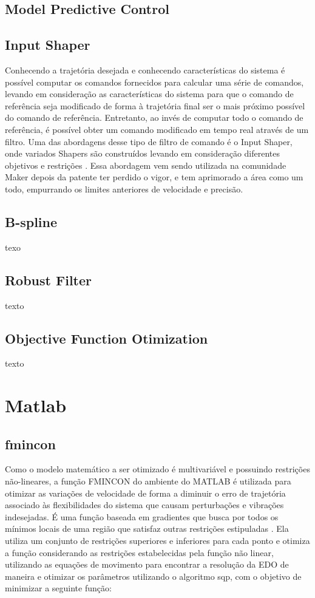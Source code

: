 \subsection{Model Predictive Control}

\subsection{Input Shaper}
Conhecendo a trajetória desejada e conhecendo características 
do sistema é possível computar os comandos fornecidos para 
calcular uma série de comandos, levando em consideração as 
características do sistema para que o comando de referência 
seja modificado de forma à trajetória final ser o mais próximo 
possível do comando de referência. Entretanto, ao invés de 
computar todo o comando de referência, é possível obter um 
comando modificado em tempo real através de um filtro. 
Uma das abordagens desse tipo de filtro de comando é o 
Input Shaper, onde variados Shapers são construídos levando 
em consideração diferentes objetivos e restrições 
\cite{singhose97}.
Essa abordagem vem sendo utilizada na comunidade Maker depois 
da patente ter perdido o vigor, e tem aprimorado a área como
um todo, empurrando os limites anteriores de velocidade e 
precisão.

\subsection{B-spline}
texo
\subsection{Robust Filter}
texto

\subsection{Objective Function Otimization}
texto

\section{Matlab}

\subsection{fmincon}

Como o modelo matemático a ser otimizado é multivariável e 
possuindo restrições não-lineares, a função FMINCON do ambiente 
do MATLAB é utilizada para otimizar as variações de velocidade 
de forma a diminuir o erro de trajetória associado às 
flexibilidades do sistema que causam perturbações e vibrações 
indesejadas.
É uma função baseada em gradientes que busca por todos os 
mínimos locais de uma região que satisfaz outras restrições 
estipuladas \cite{albaghdadi21}.
Ela utiliza um conjunto de restrições superiores e inferiores 
para cada ponto e otimiza a função considerando as restrições 
estabelecidas pela função não linear, utilizando as equações de 
movimento para encontrar a resolução da EDO de maneira e 
otimizar os parâmetros utilizando o algoritmo sqp, com o 
objetivo de minimizar a seguinte função:


